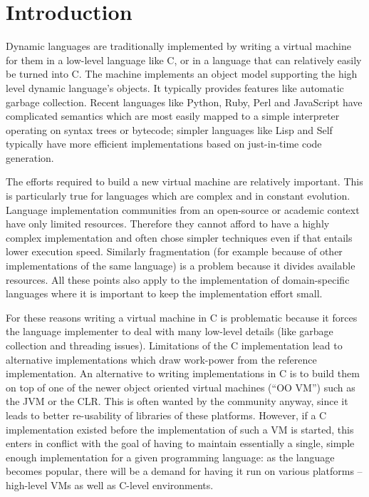 \documentclass{llncs}
\begin{document}
\section{Introduction}

Dynamic languages are traditionally implemented by writing a virtual
machine for them in a low-level language like C, or in a language that
can relatively easily be turned into C.  The machine implements an
object model supporting the high level dynamic language's objects.  It
typically provides features like automatic garbage collection.  Recent
languages like Python, Ruby, Perl and JavaScript have complicated
semantics which are most easily mapped to a simple interpreter operating
on syntax trees or bytecode; simpler languages like Lisp and Self
typically have more efficient implementations based on just-in-time code
generation.

The efforts required to build a new virtual machine are relatively
important.  This is particularly true for languages which are complex
and in constant evolution. Language implementation communities from an
open-source or academic context have only limited resources. Therefore they
cannot afford to have a highly complex implementation and often chose simpler
techniques even if that entails lower execution speed. Similarly fragmentation
(for example because of other implementations of the same language) is a
problem because it divides available resources. All these points also apply to
the implementation of domain-specific languages where it is important to keep
the implementation effort small.

For these reasons writing a virtual machine in C is problematic because it
forces the language implementer to deal with many low-level details (like
garbage collection and threading issues). Limitations
of the C implementation lead to alternative implementations which draw
work-power from the reference implementation. An alternative to writing
implementations in C is to build them on top of one of the newer object oriented
virtual machines (``OO VM'') such as the JVM or the CLR. This is often wanted by
the community anyway, since it leads to better re-usability of libraries of
these platforms. However, if a C implementation existed before the
implementation of such a VM is started, this enters in conflict with the goal of
having to maintain essentially a single, simple enough implementation for a
given programming language: as the language becomes popular, there will be a
demand for having it run on various platforms -- high-level VMs as well as
C-level environments.
\end{document}
